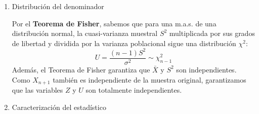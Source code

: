 \begin{enumerate}[label=\color{red}\textbf{\arabic*)}]
\begin{enumerate}[label=\arabic*)]
		            Sabemos que una observación individual $X_{n+1}$ y la media muestral $\bar{X}$ siguen distribuciones normales:
		            \[
			            \begin{array}{c}
				            X_{n+1}\sim\mathcal{N}(\mu,\sigma^2)                        \\
				            \bar{X}\sim\mathcal{N}\left(\mu, \dfrac{\sigma^2}{n}\right) \\
			            \end{array}
		            \]
		            Dado que $X_{n+1}$ es una nueva observación independiente de la muestra $(X_1,\dots,X_n)$, es independente de $\bar{X}$. La diferencia de dos variables normales independientes también es normal. Calculamos su esperanza y varianza: \[
			            \begin{array}{c}
				            \mathbb{E}[X_{n+1}-\bar{X}]=\mathbb{E}[X_{n+1}]-\mathbb{E}[\bar{X}]=\mu-\mu=0 \\
				            \mathrm{Var}\left(X_{n-1}-\bar{X}\right)=\mathrm{Var}(X_{n+1})+\mathrm{Var}(\bar{X})\sigma^2+\dfrac{\sigma^2}{n}=\sigma^2\left( 1+\dfrac{1}{n} \right) =\sigma^2\left( \dfrac{n+1}{n} \right)
			            \end{array}
		            \]
		            Por tanto, la distribución de la diferencia es: \[
			            X_{n+1}-\bar{X}\sim \mathcal{N}\left( 0,\sigma^2 \dfrac{n+1}{n} \right)
		            \]
		            Estandarizando esta variable, obtenemos una normal estándar $Z$: \[
			            Z=\dfrac{X_{n+1}-\bar{X}}{\sigma \sqrt{\frac{n+1}{n}}}\sim \mathcal{N}(0,1)
		            \]
		      \item Distribución del denominador

		            Por el \textbf{Teorema de Fisher}, sabemos que para una m.a.s. de una distribución normal, la cuasi-varianza muestral $S^2$ multiplicada por sus grados de libertad y dividida por la varianza poblacional sigue una distribución $\chi^2$: \[
			            U=\dfrac{(n-1)S^2}{\sigma^2}\sim \chi_{n-1}^2
		            \]
		            Además, el Teorema de Fisher garantiza que $\bar{X}$ y $S^2$ son independientes. Como $X_{n+1}$ también es independiente de la muestra original, garantizamos que las variables $Z$ y $U$ son totalmente independientes.
		      \item Caracterización del estadístico


\end{enumerate}
\end{enumerate}
